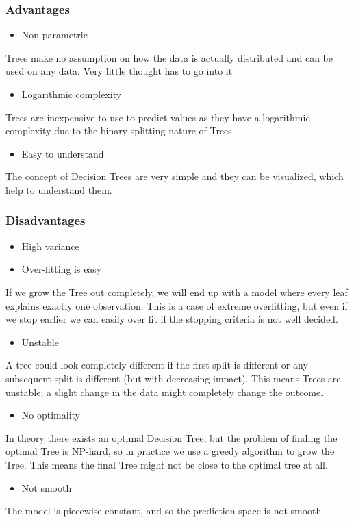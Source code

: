 \subsubsection{Advantages}
\begin{itemize}
\item Non parametric
\end{itemize}
Trees make no assumption on how the data is actually distributed and can be used on any data. Very little thought has to go into it
\begin{itemize}
\item Logarithmic complexity
\end{itemize}
Trees are inexpensive to use to predict values as they have a logarithmic complexity due to the binary splitting nature of Trees.
\begin{itemize}
\item Easy to understand
\end{itemize}
The concept of Decision Trees are very simple and they can be visualized, which help to understand them.
\subsubsection{Disadvantages}
\begin{itemize}
\item High variance
\end{itemize}

\begin{itemize}
\item Over-fitting is easy
\end{itemize}
If we grow the Tree out completely, we will end up with a model where every leaf explains exactly one observation. This is a case of extreme overfitting, but even if we stop earlier we can easily over fit if the stopping criteria is not well decided.
\begin{itemize}
\item Unstable
\end{itemize}
A tree could look completely different if the first split is different or any subsequent split is different (but with decreasing impact). This means Trees are unstable; a slight change in the data might completely change the outcome.
\begin{itemize}
\item No optimality
\end{itemize}
In theory there exists an optimal Decision Tree, but the problem of finding the optimal Tree is NP-hard, so in practice we use a greedy algorithm to grow the Tree. This means the final Tree might not be close to the optimal tree at all.
\begin{itemize}
\item Not smooth
\end{itemize}
The model is piecewise constant, and so the prediction space is not smooth.


